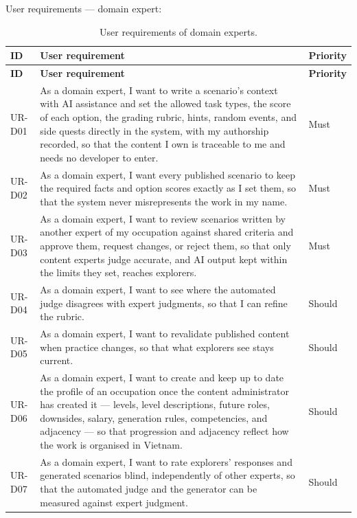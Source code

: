 User requirements --- domain expert:

{\small{}\renewcommand{\arraystretch}{1.1}
\begin{longtable}{|>{\raggedright\arraybackslash}p{}|>{\raggedright\arraybackslash}p{}|>{\raggedright\arraybackslash}p{}|}
\caption{User requirements of domain experts.} \\
\hline
\textbf{ID} & \textbf{User requirement} & \textbf{Priority} \\ \hline
\endfirsthead
\hline
\textbf{ID} & \textbf{User requirement} & \textbf{Priority} \\ \hline
\endhead
UR-D01 & As a domain expert, I want to write a scenario's context with AI assistance and set the allowed task types, the score of each option, the grading rubric, hints, random events, and side quests directly in the system, with my authorship recorded, so that the content I own is traceable to me and needs no developer to enter. & Must \\ \hline
UR-D02 & As a domain expert, I want every published scenario to keep the required facts and option scores exactly as I set them, so that the system never misrepresents the work in my name. & Must \\ \hline
UR-D03 & As a domain expert, I want to review scenarios written by another expert of my occupation against shared criteria and approve them, request changes, or reject them, so that only content experts judge accurate, and AI output kept within the limits they set, reaches explorers. & Must \\ \hline
UR-D04 & As a domain expert, I want to see where the automated judge disagrees with expert judgments, so that I can refine the rubric. & Should \\ \hline
UR-D05 & As a domain expert, I want to revalidate published content when practice changes, so that what explorers see stays current. & Should \\ \hline
UR-D06 & As a domain expert, I want to create and keep up to date the profile of an occupation once the content administrator has created it --- levels, level descriptions, future roles, downsides, salary, generation rules, competencies, and adjacency --- so that progression and adjacency reflect how the work is organised in Vietnam. & Should \\ \hline
UR-D07 & As a domain expert, I want to rate explorers' responses and generated scenarios blind, independently of other experts, so that the automated judge and the generator can be measured against expert judgment. & Should \\ \hline

\end{longtable}}
